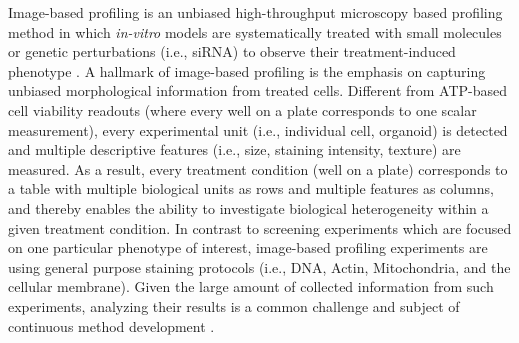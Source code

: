 \begin{flushleft}
Image-based profiling is an unbiased high-throughput microscopy based profiling method in which \textit{in-vitro} models are systematically treated with small molecules or genetic perturbations (i.e., siRNA) to observe their treatment-induced phenotype \parencite{carpenterImagebasedChemicalScreening2007, caicedoApplicationsImagebasedProfiling2016}. A hallmark of image-based profiling is the emphasis on capturing unbiased morphological information from treated cells. Different from ATP-based cell viability readouts (where every well on a plate corresponds to one scalar measurement), every experimental unit (i.e., individual cell, organoid) is detected and multiple descriptive features (i.e., size, staining intensity, texture) are measured. As a result, every treatment condition (well on a plate) corresponds to a table with multiple biological units as rows and multiple features as columns, and thereby enables the ability to investigate biological heterogeneity within a given treatment condition. In contrast to screening experiments which are focused on one particular phenotype of interest, image-based profiling experiments are using general purpose staining protocols (i.e., DNA, Actin, Mitochondria, and the cellular membrane). Given the large amount of collected information from such experiments, analyzing their results is a common challenge and subject of continuous method development \parencite{chandrasekaranImagebasedProfilingDrug2021}. 
\par


\end{flushleft}

